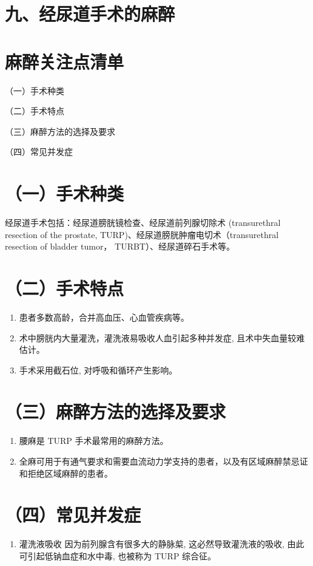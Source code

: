 \documentclass[10pt]{article}
\begin{document}
\section*{九、经尿道手术的麻醉}
\section*{麻醉关注点清单}
（一）手术种类

（二）手术特点

（三）麻醉方法的选择及要求

（四）常见并发症

\section*{（一）手术种类}
经尿道手术包括：经尿道膀胱镜检查、经尿道前列腺切除术 (transurethral resection of the prostate, TURP)、经尿道膀胱肿瘤电切术（transurethral resection of bladder tumor， TURBT）、经尿道碎石手术等。

\section*{（二）手术特点}
\begin{enumerate}
  \item 患者多数高龄，合并高血压、心血管疾病等。

  \item 术中膀胱内大量灌洗，灌洗液易吸收人血引起多种并发症, 且术中失血量较难估计。

  \item 手术采用截石位, 对呼吸和循环产生影响。

\end{enumerate}

\section*{（三）麻醉方法的选择及要求}
\begin{enumerate}
  \item 腰麻是 TURP 手术最常用的麻醉方法。

  \item 全麻可用于有通气要求和需要血流动力学支持的患者，以及有区域麻醉禁忌证和拒绝区域麻醉的患者。

\end{enumerate}

\section*{（四）常见并发症}
\begin{enumerate}
  \item 灌洗液吸收 因为前列腺含有很多大的静脉㮍, 这必然导致灌洗液的吸收, 由此可引起低钠血症和水中毒, 也被称为 TURP 综合征。
\end{enumerate}
\end{document}
